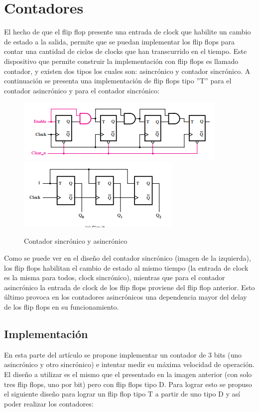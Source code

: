 \section{Contadores}

El hecho de que el flip flop presente una entrada de clock que habilite
un cambio de estado a la salida, permite que se puedan implementar
los flip flops para contar una cantidad de ciclos de clocks que han
transcurrido en el tiempo. Este dispositivo que permite construir
la implementación con flip flops es llamado contador, y existen dos
tipos los cuales son: asincrónico y contador sincrónico.
A continuación se presenta una implementación de flip flops tipo ''T''
para el contador asincrónico y para el contador sincrónico:

\begin{figure}[H]
\centering
\includegraphics[scale=0.7]{sincCOUNTER.PNG}
\qquad
\includegraphics[scale=0.7]{asincCOUNTER.PNG}
\caption{Contador sincrónico y asincrónico}
\end{figure}

Como se puede ver en el diseño del contador sincrónico (imagen de
la izquierda), los flip flops habilitan el cambio de estado al mismo
tiempo (la entrada de clock es la misma para todos, clock sincrónico),
mientras que para el contador asincrónico la entrada de clock de los
flip flops proviene del flip flop anterior. Esto último provoca en
los contadores asincrónicos una dependencia mayor del delay de los
flip flops en su funcionamiento.

\subsection{Implementación}

En esta parte del artículo se propone implementar un contador de 3
bits (uno asincrónico y otro sincrónico) e intentar medir su máxima
velocidad de operación. El diseño a utilizar es el mismo que el presentado
en la imagen anterior (con solo tres flip flops, uno por bit) pero
con flip flops tipo D. Para lograr esto se propuso el siguiente diseño
para lograr un flip flop tipo T a partir de uno tipo D y así poder
realizar los contadores:

